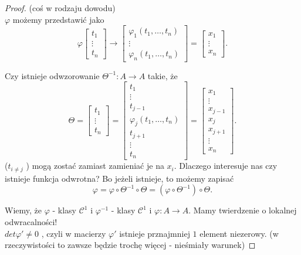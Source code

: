 \documentclass[../main.tex]{subfiles}
\begin{document}
    \begin{proof}
        (coś w rodzaju dowodu)\\
        $\varphi$ możemy przedstawić jako
        \[
            \varphi \begin{bmatrix} t_1\\ \vdots \\ t_n \end{bmatrix} \to \begin{bmatrix} \varphi_1(t_1,\ldots,t_n)\\ \vdots \\ \varphi_n(t_1,\ldots,t_n) \end{bmatrix} = \begin{bmatrix} x_1 \\ \vdots \\ x_n \end{bmatrix}
        .\]
        \begin{pytanie}
            Czy istnieje odwzorowanie $\Theta^{-1}: A\to A$ takie, że
            \[
                \Theta = \begin{bmatrix} t_1\\ \vdots \\ t_n \end{bmatrix} = \begin{bmatrix} t_1 \\ \vdots \\ t_{j-1} \\ \varphi_j(t_1,\ldots,t_n)\\ t_{j+1} \\ \vdots \\ t_n \end{bmatrix} = \begin{bmatrix} x_1 \\ \vdots \\ x_{j-1} \\ x_j \\ x_{j+1} \\ \vdots \\ x_n \end{bmatrix}
            .\]
            ($t_{i\neq j}$ ) mogą zostać zamiast zamieniać je na $x_i$.
            Dlaczego interesuje nas czy istnieje funkcja odwrotna? Bo jeżeli istnieje, to możemy zapisać
            \[
                \varphi = \varphi \circ \Theta^{-1} \circ \Theta = \left(\varphi \circ \Theta^{-1}\right) \circ \Theta
            .\]
        \end{pytanie}
        Wiemy, że $\varphi$ - klasy $\mathcal{C}^1$ i $\varphi^{-1}$ - klasy $\mathcal{C}^1$ i $\varphi: A\to A$. Mamy twierdzenie o lokalnej odwracalności!\\
        $det \varphi' \neq 0$ , czyli w macierzy $\varphi'$ istnieje prznajmniej $1$ element niezerowy. (w rzeczywistości to zawsze będzie trochę więcej - nieśmiały warunek)


\end{proof}
\end{document}
